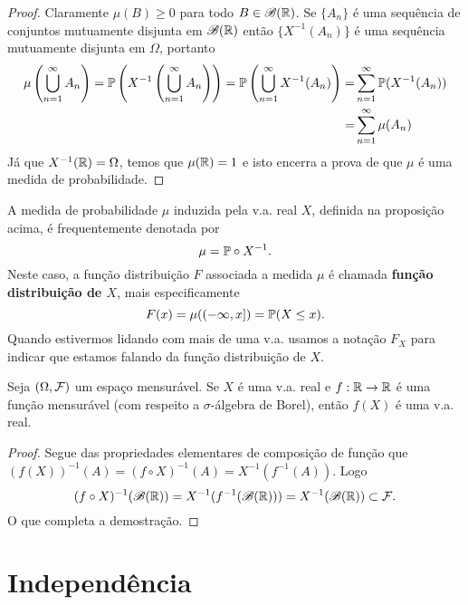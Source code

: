\begin{proof}
Claramente $\mu(B)\geq 0$ para todo $B\in \mathscr{B}(\R)$. 
Se $\{A_n\}$ é uma sequência de conjuntos 
mutuamente disjunta em $\mathscr{B}(\R)$ então 
$\{X^{-1}(A_n)\}$ é uma sequência mutuamente disjunta em $\Omega$, 
portanto 
\begin{align*}
	\mu \left( \bigcup_{n=1}^{\infty} A_n   \right)
	=
	\P \left( X^{-1}\left(\bigcup_{n=1}^{\infty} A_n \right) \right)
	=
	\P \left( \bigcup_{n=1}^{\infty} X^{-1}(A_n) \right)
	=&
	\sum_{n=1}^{\infty}\P(X^{-1}(A_n))
	\\
	=&
	\sum_{n=1}^{\infty}\mu(A_n)
\end{align*}
Já que $X^{-1}(\R)=\Omega$, temos que $\mu(\R)=1$ e
isto encerra a prova de que $\mu$ é uma medida de probabilidade.
\end{proof}

A medida de probabilidade $\mu$ induzida pela v.a. real $X$, 
definida na proposição acima, é frequentemente denotada por 
	\[
		\mu = \P\circ X^{-1}.
	\]
Neste caso, a função distribuição $F$ associada 
a medida $\mu$ é chamada 
{\bf função distribuição de $X$}, 
mais especificamente 
	\[
		F(x) = \mu((-\infty,x]) = \P(X\leq x).
	\] 
Quando estivermos lidando com mais de uma v.a. usamos 
a notação $F_X$ para indicar que estamos falando da 
função distribuição de $X$.


\begin{teorema}
	Seja $(\Omega,\F)$ um espaço mensurável. 
	Se $X$ é uma v.a. real e $f:\R\to\R$ é uma 
	função mensurável (com respeito a $\sigma$-álgebra de Borel), 
	então $f(X)$ é uma v.a. real.
\end{teorema}

\begin{proof}
 Segue das propriedades elementares de composição de função que 
 $(f(X))^{-1}(A) = (f\circ X)^{-1}(A) = X^{-1}(f^{-1}(A))$.
 Logo 
 \[
 	(f\circ X)^{-1}(\mathscr{B}(\R))
 	=
 	X^{-1}(f^{-1}(\mathscr{B}(\R)))
 	=
 	X^{-1}(\mathscr{B}(\R))
 	\subset 
 	\F.
 \]
O que completa a demostração.
\end{proof}









\section{Independência}

